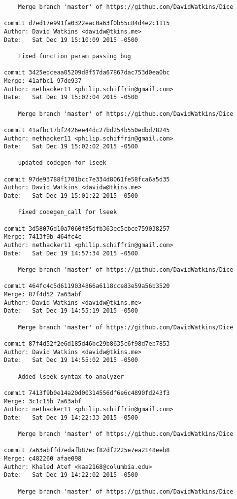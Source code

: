 \begin{verbatim}
    Merge branch 'master' of https://github.com/DavidWatkins/Dice

commit d7ed17e991fa0322eac0a63f0b55c84d4e2c1115
Author: David Watkins <davidw@tkins.me>
Date:   Sat Dec 19 15:10:09 2015 -0500

    Fixed function param passing bug

commit 3425edceaa05209d8f57da67867dac753d0ea0bc
Merge: 41afbc1 97de937
Author: nethacker11 <philip.schiffrin@gmail.com>
Date:   Sat Dec 19 15:02:04 2015 -0500

    Merge branch 'master' of https://github.com/DavidWatkins/Dice

commit 41afbc17bf2426ee44dc27bd254b550edbd78245
Author: nethacker11 <philip.schiffrin@gmail.com>
Date:   Sat Dec 19 15:02:02 2015 -0500

    updated codegen for lseek

commit 97de93788f1701bcc7e334d8061fe58fca6a5d35
Author: David Watkins <davidw@tkins.me>
Date:   Sat Dec 19 15:01:22 2015 -0500

    Fixed codegen_call for lseek

commit 3d58076d10a7060f85dfb363ec5cbce759038257
Merge: 7413f9b 464fc4c
Author: nethacker11 <philip.schiffrin@gmail.com>
Date:   Sat Dec 19 14:57:34 2015 -0500

    Merge branch 'master' of https://github.com/DavidWatkins/Dice

commit 464fc4c5d6119034866a6118cce83e59a56b3520
Merge: 87f4d52 7a63abf
Author: David Watkins <davidw@tkins.me>
Date:   Sat Dec 19 14:55:19 2015 -0500

    Merge branch 'master' of https://github.com/DavidWatkins/Dice

commit 87f4d52f2e6d185d46bc29b8635c6f98d7eb7853
Author: David Watkins <davidw@tkins.me>
Date:   Sat Dec 19 14:55:02 2015 -0500

    Added lseek syntax to analyzer

commit 7413f9b0e14a20d00314556df6e6c4890fd243f3
Merge: 3c1c15b 7a63abf
Author: nethacker11 <philip.schiffrin@gmail.com>
Date:   Sat Dec 19 14:22:33 2015 -0500

    Merge branch 'master' of https://github.com/DavidWatkins/Dice

commit 7a63abffd7edafb87ecf82df2225e7ea2148eeb8
Merge: c482260 afae098
Author: Khaled Atef <kaa2168@columbia.edu>
Date:   Sat Dec 19 14:22:02 2015 -0500

    Merge branch 'master' of https://github.com/DavidWatkins/Dice


\end{verbatim}
